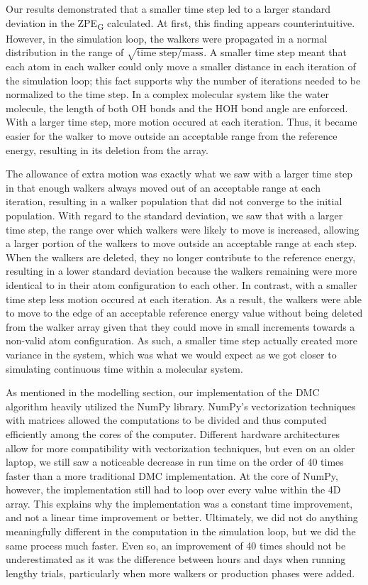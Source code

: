 \documentclass[journal=jacsat,manuscript=article]{achemso}
\begin{document}
Our results demonstrated that a smaller time step led to a larger standard deviation in the ZPE\textsubscript{G} calculated. At first, this finding appears counterintuitive. However, in the simulation loop, the walkers were propagated in a normal distribution in the range of $\sqrt{\text{time step}/\text{mass}}$. A smaller time step meant that each atom in each walker could only move a smaller distance in each iteration of the simulation loop; this fact supports why the number of iterations needed to be normalized to the time step. In a complex molecular system like the water molecule, the length of both OH bonds and the HOH bond angle are enforced. With a larger time step, more motion occured at each iteration. Thus, it became easier for the walker to move outside an acceptable range from the reference energy, resulting in its deletion from the array. 

The allowance of extra motion was exactly what we saw with a larger time step in that enough walkers always moved out of an acceptable range at each iteration, resulting in a walker population that did not converge to the initial population. With regard to the standard deviation, we saw that with a larger time step, the range over which walkers were likely to move is increased, allowing a larger portion of the walkers to move outside an acceptable range at each step. When the walkers are deleted, they no longer contribute to the reference energy, resulting in a lower standard deviation because the walkers remaining were more identical to in their atom configuration to each other. In contrast, with a smaller time step less motion occured at each iteration. As a result, the walkers were able to move to the edge of an acceptable reference energy value without being deleted from the walker array given that they could move in small increments towards a non-valid atom configuration. As such, a smaller time step actually created more variance in the system, which was what we would expect as we got closer to simulating continuous time within a molecular system. 

As mentioned in the modelling section, our implementation of the DMC algorithm heavily utilized the NumPy library. NumPy’s vectorization techniques with matrices allowed the computations to be divided and thus computed efficiently among the cores of the computer. Different hardware architectures allow for more compatibility with vectorization techniques, but even on an older laptop, we still saw a noticeable decrease in run time on the order of 40 times faster than a more traditional DMC implementation. At the core of NumPy, however, the implementation still had to loop over every value within the 4D array. This explains why the implementation was a constant time improvement, and not a linear time improvement or better. Ultimately, we did not do anything meaningfully different in the computation in the simulation loop, but we did the same process much faster. Even so, an improvement of 40 times should not be underestimated as it was the difference between hours and days when running lengthy trials, particularly when more walkers or production phases were added.
\end{document}
